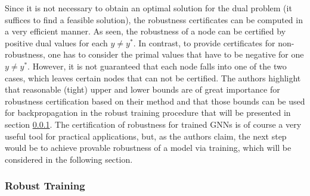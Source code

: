 \documentclass[a4paper,preprint]{sig-alternate}
\begin{document}
Since it is not necessary to obtain an optimal solution for the dual problem (it suffices to find a feasible solution), the robustness certificates
can be computed in a very efficient manner. As seen, the robustness of a node can be certified by positive dual values for each $y \neq y^{\ast}$.
In contrast, to provide certificates for non-robustness, one has to consider the primal values that have to be negative for one $y \neq y^*$. \cite{Zuegner_2019}
However, it is not guaranteed that each node falls into one of the two cases, which leaves certain nodes that can not be certified.
The authors highlight that reasonable (tight) upper and lower bounds are of great importance for robustness certification based on their method
and that those bounds can be used for backpropagation in the robust training procedure that will be presented in section \ref{subsec:robust_training}.\newline
The certification of robustness for trained GNNs is of course a very useful tool for practical applications, 
but, as the authors claim, the next step would be to achieve provable robustness of a model via training,
which will be considered in the following section.

\subsubsection{Robust Training}
\label{subsec:robust_training}
\end{document}
